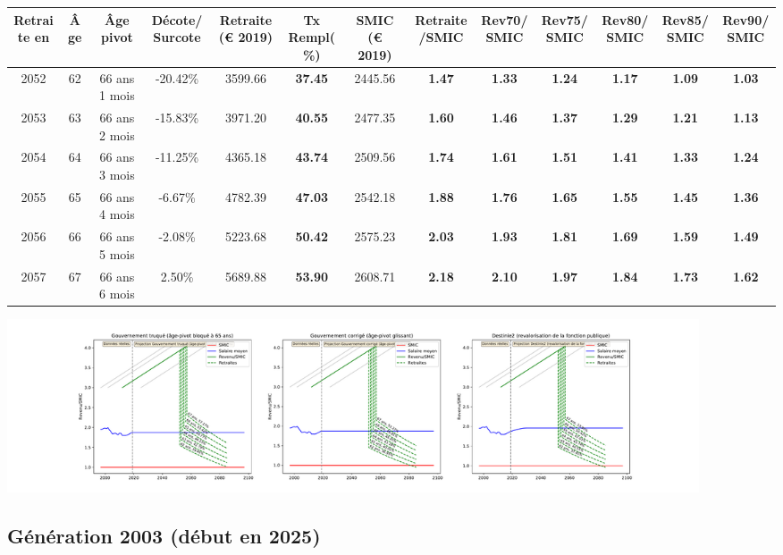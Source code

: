 { \scriptsize \begin{center} 
\begin{tabular}[htb]{|c|c||c|c||c|c||c||c|c|c|c|c|c|} 
\hline 
 Retraite en &  Âge &  Âge pivot &  Décote/Surcote &  Retraite (\euro{} 2019) &  Tx Rempl(\%) &  SMIC (\euro{} 2019) &  Retraite/SMIC &  Rev70/SMIC &  Rev75/SMIC &  Rev80/SMIC &  Rev85/SMIC &  Rev90/SMIC \\ 
\hline \hline 
 2052 &  62 &  66 ans 1 mois &  -20.42\% &  3599.66 &  {\bf 37.45} &  2445.56 &  {\bf 1.47} &  {\bf 1.33} &  {\bf 1.24} &  {\bf 1.17} &  {\bf 1.09} &  {\bf 1.03} \\ 
\hline 
 2053 &  63 &  66 ans 2 mois &  -15.83\% &  3971.20 &  {\bf 40.55} &  2477.35 &  {\bf 1.60} &  {\bf 1.46} &  {\bf 1.37} &  {\bf 1.29} &  {\bf 1.21} &  {\bf 1.13} \\ 
\hline 
 2054 &  64 &  66 ans 3 mois &  -11.25\% &  4365.18 &  {\bf 43.74} &  2509.56 &  {\bf 1.74} &  {\bf 1.61} &  {\bf 1.51} &  {\bf 1.41} &  {\bf 1.33} &  {\bf 1.24} \\ 
\hline 
 2055 &  65 &  66 ans 4 mois &  -6.67\% &  4782.39 &  {\bf 47.03} &  2542.18 &  {\bf 1.88} &  {\bf 1.76} &  {\bf 1.65} &  {\bf 1.55} &  {\bf 1.45} &  {\bf 1.36} \\ 
\hline 
 2056 &  66 &  66 ans 5 mois &  -2.08\% &  5223.68 &  {\bf 50.42} &  2575.23 &  {\bf 2.03} &  {\bf 1.93} &  {\bf 1.81} &  {\bf 1.69} &  {\bf 1.59} &  {\bf 1.49} \\ 
\hline 
 2057 &  67 &  66 ans 6 mois &  2.50\% &  5689.88 &  {\bf 53.90} &  2608.71 &  {\bf 2.18} &  {\bf 2.10} &  {\bf 1.97} &  {\bf 1.84} &  {\bf 1.73} &  {\bf 1.62} \\ 
\hline 
\hline 
\end{tabular} 
\end{center} } 

 \begin{center}\includegraphics[width=0.9\textwidth]{fig/Ascendant34_1990_22_dest_retraite.pdf}\end{center} \label{fig/Ascendant34_1990_22_dest_retraite.pdf} 

\newpage 
 
\subsection{Génération 2003 (début en 2025)} 

